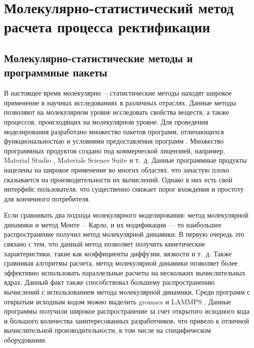 \section{Молекулярно-статистический метод расчета процесса ректификации}



\subsection{Молекулярно-статистические методы и программные пакеты}

В настоящее время молекулярно~-- статистические методы находят широкое применение в научных исследованиях в различных отраслях. Данные методы позволяют на молекулярном уровне исследовать свойства веществ, а также процессов, происходящих на молекулярном уровне. Для проведения моделирования разработано множество пакетов программ, отличающихся функциональностью и условиями предоставления программ \cite{wiki_progs}. Множество программных продуктов создано под коммерческой лицензией, например, Material Studio \cite{material_studio} , Materials Science Suite \cite{shedinger} и т.~д. Данные программные продукты нацелены на широкое применение во многих областях, что зачастую плохо сказывается на производительности их вычислений. Однако в них есть свой интерфейс пользователя, что существенно снижает порог вхождения и простоту для конченного потребителя.

Если сравнивать два подхода молекулярного моделирования: метод молекулярной динамики и метод Монте~-- Карло, и их модификации --- то наибольшее распространение получил метод молекулярной динамики. В первую очередь это связано с тем, что данный метод позволяет получить кинетические характеристики, такие как коэффициенты диффузии, вязкости и т.~д. Также сравнивая алгоритмы расчета, метод молекулярной динамики позволяет более эффективно использовать параллельные расчеты на нескольких вычислительных ядрах. Данный факт также способствовал большему распространению вычислений с использованием метода молекулярной динамики. Среди программ с открытым исходным кодом можно выделить gromacs \cite{Berendsen1995,Pronk2013,Abraham2015} и LAMMPS \cite{Plimpton1995,Thompson2009} . Данные программы получили широкое распространение за счет открытого исходного кода и большого количества заинтересованных разработчиков, что привело к отличной вычислительной производительности, в том числе на специфическом оборудовании. 

